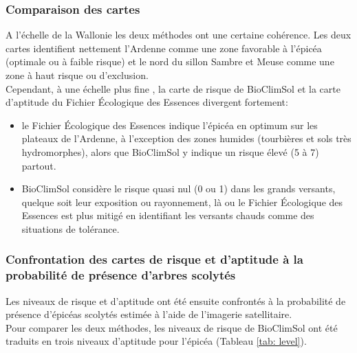 \subsubsection{Comparaison des cartes}
A l'échelle de la Wallonie les deux méthodes ont une certaine cohérence. Les deux cartes identifient nettement l'Ardenne comme une zone favorable à l'épicéa (optimale ou à faible risque) et le nord du sillon Sambre et Meuse comme une zone à haut risque ou d'exclusion.\\

Cependant, à une échelle plus fine , la carte de risque de BioClimSol et la carte d'aptitude du Fichier Écologique des Essences divergent fortement:


\begin{itemize}
	\item  le Fichier Écologique des Essences indique l'épicéa en optimum sur les plateaux de l'Ardenne, à l'exception des zones humides (tourbières et sols très hydromorphes), alors que BioClimSol y indique un risque élevé (5 à 7) partout.
	\item BioClimSol considère le risque quasi nul (0 ou 1) dans les grands versants, quelque soit leur exposition ou rayonnement, là ou le Fichier Écologique des Essences est plus mitigé en identifiant les versants chauds comme des situations de tolérance.
\end{itemize}

\subsubsection{Confrontation des cartes de risque et d'aptitude à la probabilité de présence d'arbres scolytés}

Les niveaux de risque et d'aptitude ont été ensuite confrontés à la probabilité de présence d'épicéas scolytés estimée à l'aide de l'imagerie satellitaire. \\

Pour comparer les deux méthodes, les niveaux de risque de BioClimSol ont été traduits en trois niveaux d'aptitude pour l'épicéa (Tableau \ref{tab: level}).

